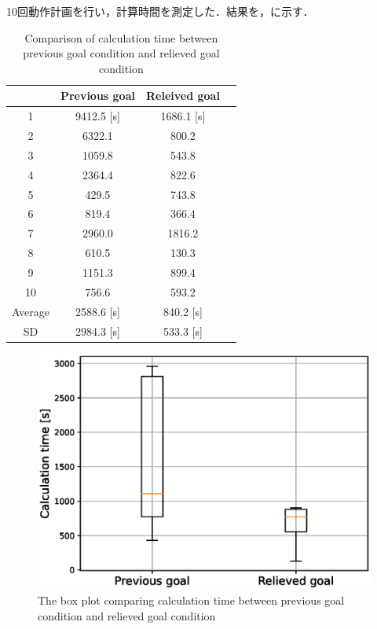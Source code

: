 \documentclass[a4paper,twoside,12pt,papersize, dvipdfmx]{iirthesis}
\begin{document}
10回動作計画を行い，計算時間を測定した．結果を，に示す．
\begin{table}[bt]
    \centering
    \caption{Comparison of calculation time between previous goal condition and relieved goal condition}
    \label{tab::planner::goalconddiff}
    \begin{tabular}{|c|c|c|c|}
    \hline
        ~ & Previous goal & Releived goal  \\ \hline
        1 & 9412.5 [s] & 1686.1 [s]  \\ \hline
        2 & 6322.1 & 800.2 \\ \hline
        3 & 1059.8 & 543.8  \\ \hline
        4 & 2364.4 & 822.6  \\ \hline
        5 & 429.5 & 743.8 \\ \hline
        6 & 819.4 & 366.4  \\ \hline
        7 & 2960.0 & 1816.2  \\ \hline
        8 & 610.5 & 130.3  \\ \hline
        9 & 1151.3 & 899.4  \\ \hline
        10 & 756.6 & 593.2  \\ \hline
        Average & 2588.6 [s]  & 840.2 [s]  \\ \hline
        SD & 2984.3 [s] & 533.3 [s]  \\ \hline
    \end{tabular}
\end{table}
\begin{figure}[bt]
\centering
\includegraphics[width=0.5\hsize]{fig/3-new-planner/3_2_1.eps}
\caption{The box plot comparing calculation time between previous goal condition and relieved goal condition}
\label{fig::planner::goalconddiff}
\end{figure}
\end{document}
